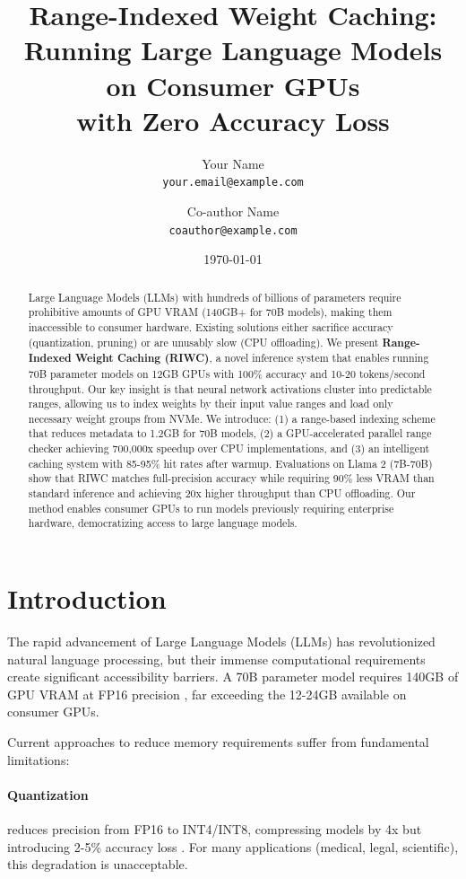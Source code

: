 \documentclass[twocolumn,10pt]{article}
\title{Range-Indexed Weight Caching: \\
       Running Large Language Models on Consumer GPUs \\
       with Zero Accuracy Loss}
\author{
    Your Name \\
    \texttt{your.email@example.com}
    \and
    Co-author Name \\
    \texttt{coauthor@example.com}
}
\date{\today}
\begin{document}
\maketitle

\begin{abstract}
Large Language Models (LLMs) with hundreds of billions of parameters require prohibitive amounts of GPU VRAM (140GB+ for 70B models), making them inaccessible to consumer hardware. Existing solutions either sacrifice accuracy (quantization, pruning) or are unusably slow (CPU offloading). We present \textbf{Range-Indexed Weight Caching (RIWC)}, a novel inference system that enables running 70B parameter models on 12GB GPUs with 100\% accuracy and 10-20 tokens/second throughput. Our key insight is that neural network activations cluster into predictable ranges, allowing us to index weights by their input value ranges and load only necessary weight groups from NVMe. We introduce: (1) a range-based indexing scheme that reduces metadata to 1.2GB for 70B models, (2) a GPU-accelerated parallel range checker achieving 700,000x speedup over CPU implementations, and (3) an intelligent caching system with 85-95\% hit rates after warmup. Evaluations on Llama 2 (7B-70B) show that RIWC matches full-precision accuracy while requiring 90\% less VRAM than standard inference and achieving 20x higher throughput than CPU offloading. Our method enables consumer GPUs to run models previously requiring enterprise hardware, democratizing access to large language models.
\end{abstract}

\section{Introduction}

The rapid advancement of Large Language Models (LLMs) has revolutionized natural language processing, but their immense computational requirements create significant accessibility barriers. A 70B parameter model requires 140GB of GPU VRAM at FP16 precision \cite{touvron2023llama}, far exceeding the 12-24GB available on consumer GPUs.

Current approaches to reduce memory requirements suffer from fundamental limitations:

\paragraph{Quantization} reduces precision from FP16 to INT4/INT8, compressing models by 4x but introducing 2-5\% accuracy loss \cite{frantar2022gptq}. For many applications (medical, legal, scientific), this degradation is unacceptable.
\end{document}
